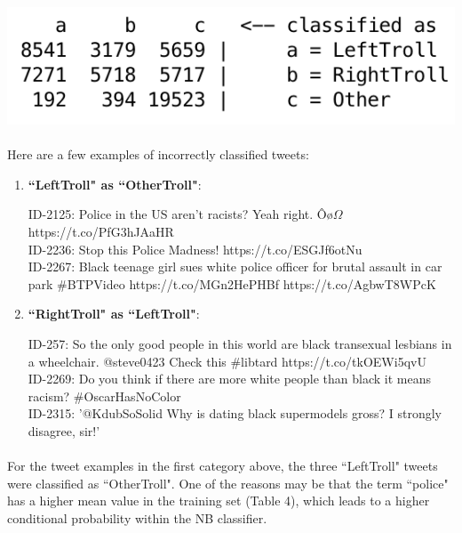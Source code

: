 \documentclass[11pt]{article}
\begin{document}
\includegraphics[scale=0.65]{"conf-matrix"}

\paragraph{} Here are a few examples of incorrectly classified tweets:

\begin{enumerate}

\item
\textbf{``LeftTroll" as ``OtherTroll"}:

ID-2125: Police in the US aren't racists? Yeah right. Ôø$\Omega$ https://t.co/PfG3hJAaHR \\

ID-2236: Stop this Police Madness!  https://t.co/ESGJf6otNu \\

ID-2267: Black teenage girl sues white police officer for brutal assault in car park \#BTPVideo  https://t.co/MGn2HePHBf https://t.co/AgbwT8WPcK


\item
\textbf{``RightTroll" as ``LeftTroll"}:

ID-257: So the only good people in this world are black transexual lesbians in a wheelchair. @steve0423 Check this \#libtard https://t.co/tkOEWi5qvU \\

ID-2269: Do you think if there are more white people than black it means racism?  \#OscarHasNoColor \\

ID-2315: ’@KdubSoSolid Why is dating black supermodels gross? I strongly disagree, sir!' \\

\end{enumerate}

\paragraph{} For the tweet examples in the first category above, the three ``LeftTroll" tweets were classified as ``OtherTroll". One of the reasons may be that the term ``police" has a higher mean value in the training set (Table 4), which leads to a higher conditional probability within the NB classifier.
\end{document}
